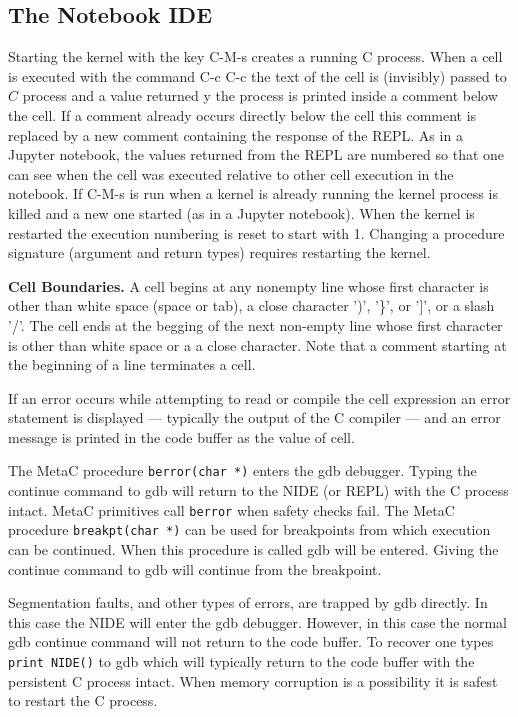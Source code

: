 \documentclass{article}
\begin{document}
\subsection{The Notebook IDE}
\label{sec:Emacs}

Starting the kernel with the key C-M-s creates a running C process.  When a cell is executed
with the command C-c C-c the text of the cell is (invisibly) passed to $C$ process and a value returned
y the process is printed inside a comment below the cell.  If a comment already occurs directly below the cell this
comment is replaced by a new comment containing the response of the REPL.  As in a Jupyter notebook,
the values returned from the REPL are numbered so that one can see when the cell was executed
relative to other cell execution in the notebook.  If C-M-s is run when a kernel is already running
the kernel process is killed and a new one started (as in a Jupyter notebook).  When the kernel is
restarted the execution numbering is reset to start with 1.  Changing a procedure signature
(argument and return types) requires restarting the kernel.

{\bf Cell Boundaries.}
A cell begins at any nonempty line whose first character is other than white space (space or tab), a close character ')', '\}', or ']', or a slash '/'.
The cell ends at the begging of the next non-empty line whose first character is other than white space or a a close character.  Note that a comment
starting at the beginning of a line terminates a cell.

If an error occurs while attempting to read or compile the cell expression an error statement is displayed --- typically the output of the C compiler --- and
an error message is printed in the code buffer as the value of cell.

 The MetaC procedure {\tt berror(char *)} enters the gdb debugger. Typing the continue command
to gdb will return to the NIDE (or REPL) with the C process intact. MetaC primitives call {\tt berror} when safety checks fail.
The MetaC procedure {\tt breakpt(char *)} can be used for breakpoints from which execution can be continued.  When this procedure is called
gdb will be entered. Giving the continue command to gdb will continue from the breakpoint.

 Segmentation faults, and other types of errors, are trapped by gdb directly.  In this case the
NIDE will enter the gdb debugger.  However, in this case the normal gdb continue command will not return to the code buffer.
To recover one types {\tt print NIDE()} to gdb which will typically
return to the code buffer with the persistent C process intact.  When
memory corruption is a possibility it is safest to restart the C
process.
\end{document}
